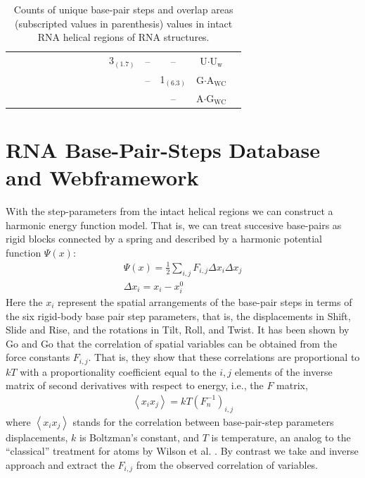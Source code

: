 \begin{table}
\begin{center}
\begin{tabular}{|c|c|c|c|c|c|c|c|c|c|c|c|c|c|c|}
 &  &  &  &  &  &  &  &  &  & 3$_{(\text{1.7})}$ & -- & -- & U$\cdot$U$_{\text{w}}$\\
 &  &  &  &  &  &  &  &  &  &  & -- & 1$_{(\text{6.3})}$ & G$\cdot$A$_{\text{WC}}$\\
 &  &  &  &  &  &  &  &  &  &  &  & -- & A$\cdot$G$_{\text{WC}}$\\
\hline
\end{tabular}
\caption{Counts   of  unique   base-pair  steps   and   overlap  areas
(subscripted  values  in parenthesis)  values  in  intact RNA  helical
regions of RNA structures.}
\label{tab:91steps}
\end{center}
\end{table}



\section{RNA Base-Pair-Steps Database and Webframework}
With  the  step-parameters from  the  intact  helical  regions we  can
construct  a harmonic  energy function  model. That  is, we  can treat
succesive  base-pairs  as  rigid  blocks  connected by  a  spring  and
described by a harmonic potential function $\Psi(x)$:
\begin{gather}
\Psi (x) = \frac{1}{2}\sum_{i,j} F_{i,j} \Delta x_{i} \Delta x_{j}\\
\Delta x_{i}=x_{i}-x_{i}^{0}
\end{gather} 
Here the  $x_{i}$ represent the spatial arrangements  of the base-pair
steps in terms  of the six rigid-body base  pair step parameters, that
is, the displacements  in Shift, Slide and Rise,  and the rotations in
Tilt, Roll,  and Twist. It has  been shown by Go  and Go \cite{go1976}
that the  correlation of  spatial variables can  be obtained  from the
force constants $F_{i,j}$. That  is, they show that these correlations
are proportional  to $kT$ with a proportionality  coefficient equal to
the $i,j$  elements of the  inverse matrix of second  derivatives with
respect to energy, i.e., the $F$ matrix,
\begin{gather}
\left<x_i x_j\right> = kT (F_{n}^{-1})_{i,j}
\end{gather} 
where  $\left< x_i  x_j \right>$  stands for  the  correlation between
base-pair-step parameters displacements,  $k$ is  Boltzman's constant,
and $T$ is  temperature, an analog to the  ``classical'' treatment for
atoms  by Wilson  et al.  \cite{wilson1955}. By  contrast we  take and
inverse  approach   and  extract  the  $F_{i,j}$   from  the  observed
correlation of variables.

